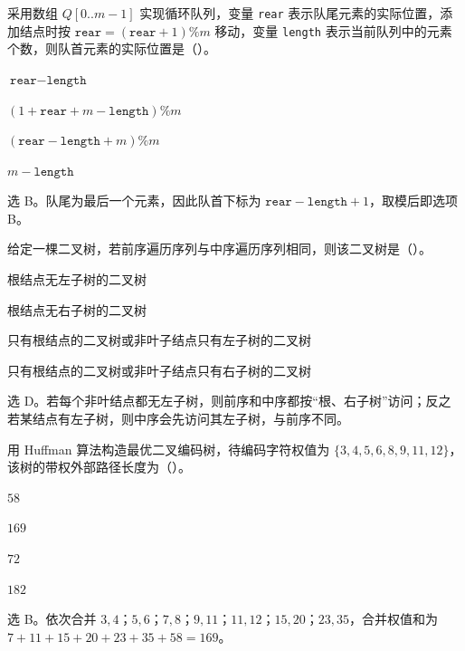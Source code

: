 \begin{question}
采用数组 $Q[0..m-1]$ 实现循环队列，变量 \texttt{rear} 表示队尾元素的实际位置，添加结点时按 $\texttt{rear}=(\texttt{rear}+1)\%m$ 移动，变量 \texttt{length} 表示当前队列中的元素个数，则队首元素的实际位置是（\quad）。
\begin{choiceoptions}[1]
  \item $\texttt{rear}-\texttt{length}$
  \item $(1+\texttt{rear}+m-\texttt{length})\%m$
  \item $(\texttt{rear}-\texttt{length}+m)\%m$
  \item $m-\texttt{length}$
\end{choiceoptions}
\begin{solution}
选 B。队尾为最后一个元素，因此队首下标为 $\texttt{rear}-\texttt{length}+1$，取模后即选项 B。
\end{solution}
\end{question}

\begin{question}
给定一棵二叉树，若前序遍历序列与中序遍历序列相同，则该二叉树是（\quad）。
\begin{choiceoptions}[2]
  \item 根结点无左子树的二叉树
  \item 根结点无右子树的二叉树
  \item 只有根结点的二叉树或非叶子结点只有左子树的二叉树
  \item 只有根结点的二叉树或非叶子结点只有右子树的二叉树
\end{choiceoptions}
\begin{solution}
选 D。若每个非叶结点都无左子树，则前序和中序都按“根、右子树”访问；反之若某结点有左子树，则中序会先访问其左子树，与前序不同。
\end{solution}
\end{question}

\begin{question}
用 Huffman 算法构造最优二叉编码树，待编码字符权值为 $\{3,4,5,6,8,9,11,12\}$，该树的带权外部路径长度为（\quad）。
\begin{choiceoptions}[2]
  \item $58$
  \item $169$
  \item $72$
  \item $182$
\end{choiceoptions}
\begin{solution}
选 B。依次合并 $3,4$；$5,6$；$7,8$；$9,11$；$11,12$；$15,20$；$23,35$，合并权值和为 $7+11+15+20+23+35+58=169$。
\end{solution}
\end{question}

